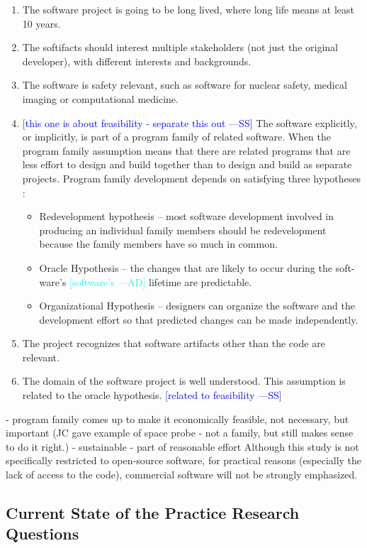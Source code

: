 \documentclass[12pt]{article}
\newcommand{\authornote}[3]{\textcolor{#1}{[#3 ---#2]}}
\newcommand{\authornote}[3]{}
\newcommand{\wss}[1]{\authornote{blue}{SS}{#1}} %
\newcommand{\ad}[1]{\authornote{cyan}{AD}{#1}} %
\begin{document}
\begin{enumerate}
\item The software project is going to be long lived, where long life means at
  least 10 years.
\item The softifacts should interest multiple stakeholders (not just the
  original developer), with different interests and backgrounds.
\item The software is safety relevant, such as software for nuclear safety,
  medical imaging or computational medicine.
\item \wss{this one is about feasibility - separate this out} The software explicitly, or implicitly, is part of a program family of
  related software.  When the program family assumption means that there are
  related programs that are less effort to design and build together than to
  design and build as separate projects.  Program family development depends on
  satisfying three hypotheses \citep{Weiss1997}:
\begin{itemize}
\item Redevelopment hypothesis – most software development involved in producing
  an individual family members should be redevelopment because the family
  members have so much in common.
\item Oracle Hypothesis – the changes that are likely to occur during the soft-
  ware’s \ad{software's} lifetime are predictable.
\item Organizational Hypothesis – designers can organize the software and the
  development effort so that predicted changes can be made independently.
\end{itemize}
\item The project recognizes that software artifacts other than the code are
  relevant.
\item The domain of the software project is well understood.  This assumption is
  related to the oracle hypothesis. \wss{related to feasibility}
\end{enumerate}

- program family comes up to make it economically feasible, not necessary, but
important (JC gave example of space probe - not a family, but still makes sense
to do it right.)
- sustainable - part of reasonable effort
Although this study is not specifically restricted to open-source software, for
practical reasons (especially the lack of access to the code), commercial
software will not be strongly emphasized.

\subsection{Current State of the Practice Research Questions} \label{Sec_ResearchQuestions}
\end{document}

